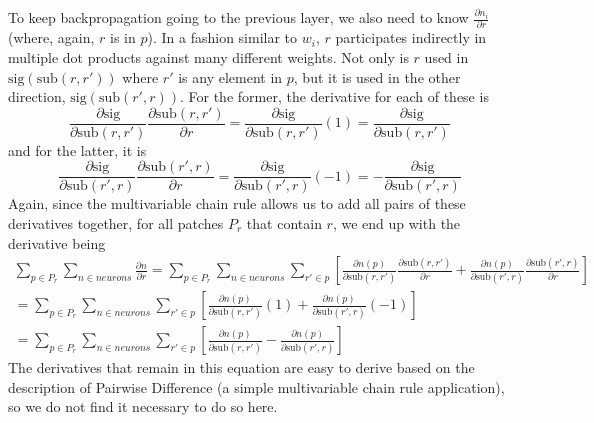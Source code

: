 To keep backpropagation\cite{rumelhart} going to the previous layer, we also need to know
$\frac{\partial n_i}{\partial r}$ (where, again, $r$ is in $p$). In a fashion similar to $w_i$,
$r$ participates indirectly in multiple dot products against many different weights. Not only is $r$
used in $\text{sig}(\text{sub}(r, r'))$ where $r'$ is any element in $p$, but it is used in the other direction,
$\text{sig}(\text{sub}(r', r))$. For the former, the derivative for each of these is
\[
    \frac{\partial \text{sig}}{\partial \text{sub}(r, r')} \frac{\partial \text{sub}(r, r')}{\partial r}
    = \frac{\partial \text{sig}}{\partial \text{sub}(r, r')} (1)
    = \frac{\partial \text{sig}}{\partial \text{sub}(r, r')}
\]
and for the latter, it is
\[
    \frac{\partial \text{sig}}{\partial \text{sub}(r', r)} \frac{\partial \text{sub}(r', r)}{\partial r}
    = \frac{\partial \text{sig}}{\partial \text{sub}(r', r)} (-1)
    = - \frac{\partial \text{sig}}{\partial \text{sub}(r', r)}
\]
Again, since the multivariable chain rule allows us to add all pairs of these derivatives together,
for all patches $P_r$ that contain $r$, we end up with the derivative being
\begin{multline}
    \sum_{p \in P_r} \sum_{n \in neurons} \frac{\partial n}{\partial r}
    = \sum_{p \in P_r} \sum_{n \in neurons} \sum_{r' \in p} \left[ \frac{\partial n(p)}{\partial \text{sub}(r, r')} \frac{\partial \text{sub}(r, r')}{\partial r} + \frac{\partial n(p)}{\partial \text{sub}(r', r)} \frac{\partial \text{sub}(r', r)}{\partial r} \right]\\[10pt]
    = \sum_{p \in P_r} \sum_{n \in neurons} \sum_{r' \in p} \left[ \frac{\partial n(p)}{\partial \text{sub}(r, r')} (1) + \frac{\partial n(p)}{\partial \text{sub}(r', r)} (-1) \right]\\[10pt]
    = \sum_{p \in P_r} \sum_{n \in neurons} \sum_{r' \in p} \left[ \frac{\partial n(p)}{\partial \text{sub}(r, r')} - \frac{\partial n(p)}{\partial \text{sub}(r', r)} \right]
\end{multline}
The derivatives that remain in this equation are easy to derive based on the description of Pairwise
Difference (a simple multivariable chain rule application), so we do not find it necessary to do so
here.







